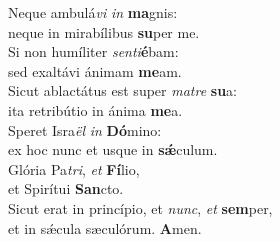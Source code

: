 \evenverse Neque ambulá\textit{vi} \textit{in} \textbf{ma}gnis:~\*\\
\evenverse neque in mirabílibus \textbf{su}per me.\\
\oddverse Si non humíliter \textit{sen}\textit{ti}\textbf{é}bam:~\*\\
\oddverse sed exaltávi ánimam \textbf{me}am.\\
\evenverse Sicut ablactátus est super \textit{ma}\textit{tre} \textbf{su}a:~\*\\
\evenverse ita retribútio in ánima \textbf{me}a.\\
\oddverse Speret Isra\textit{ël} \textit{in} \textbf{Dó}mino:~\*\\
\oddverse ex hoc nunc et usque in \textbf{sǽ}culum.\\
\evenverse Glória Pa\textit{tri}, \textit{et} \textbf{Fí}lio,~\*\\
\evenverse et Spirítui \textbf{San}cto.\\
\oddverse Sicut erat in princípio, et \textit{nunc}, \textit{et} \textbf{sem}per,~\*\\
\oddverse et in sǽcula sæculórum. \textbf{A}men.\\
